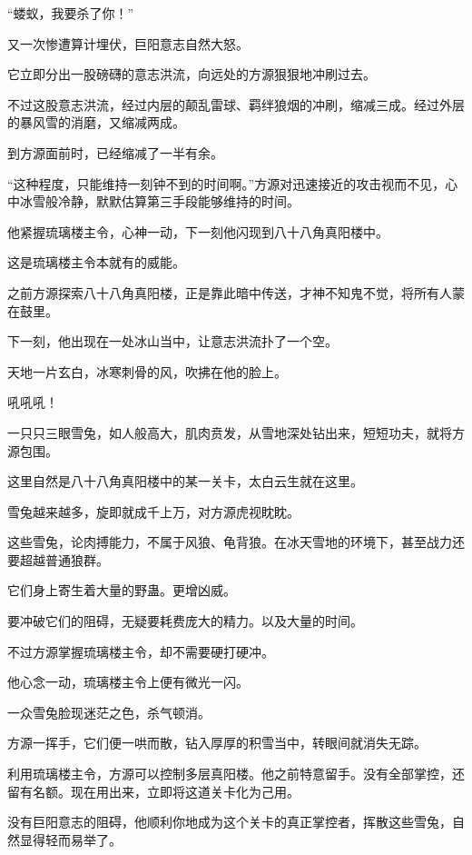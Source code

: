 
\begin{this_body}

“蝼蚁，我要杀了你！”

又一次惨遭算计埋伏，巨阳意志自然大怒。

它立即分出一股磅礴的意志洪流，向远处的方源狠狠地冲刷过去。

不过这股意志洪流，经过内层的颠乱雷球、羁绊狼烟的冲刷，缩减三成。经过外层的暴风雪的消磨，又缩减两成。

到方源面前时，已经缩减了一半有余。

“这种程度，只能维持一刻钟不到的时间啊。”方源对迅速接近的攻击视而不见，心中冰雪般冷静，默默估算第三手段能够维持的时间。

他紧握琉璃楼主令，心神一动，下一刻他闪现到八十八角真阳楼中。

这是琉璃楼主令本就有的威能。

之前方源探索八十八角真阳楼，正是靠此暗中传送，才神不知鬼不觉，将所有人蒙在鼓里。

下一刻，他出现在一处冰山当中，让意志洪流扑了一个空。

天地一片玄白，冰寒刺骨的风，吹拂在他的脸上。

吼吼吼！

一只只三眼雪兔，如人般高大，肌肉贲发，从雪地深处钻出来，短短功夫，就将方源包围。

这里自然是八十八角真阳楼中的某一关卡，太白云生就在这里。

雪兔越来越多，旋即就成千上万，对方源虎视眈眈。

这些雪兔，论肉搏能力，不属于风狼、龟背狼。在冰天雪地的环境下，甚至战力还要超越普通狼群。

它们身上寄生着大量的野蛊。更增凶威。

要冲破它们的阻碍，无疑要耗费庞大的精力。以及大量的时间。

不过方源掌握琉璃楼主令，却不需要硬打硬冲。

他心念一动，琉璃楼主令上便有微光一闪。

一众雪兔脸现迷茫之色，杀气顿消。

方源一挥手，它们便一哄而散，钻入厚厚的积雪当中，转眼间就消失无踪。

利用琉璃楼主令，方源可以控制多层真阳楼。他之前特意留手。没有全部掌控，还留有名额。现在用出来，立即将这道关卡化为己用。

没有巨阳意志的阻碍，他顺利你地成为这个关卡的真正掌控者，挥散这些雪兔，自然显得轻而易举了。


\end{this_body}
